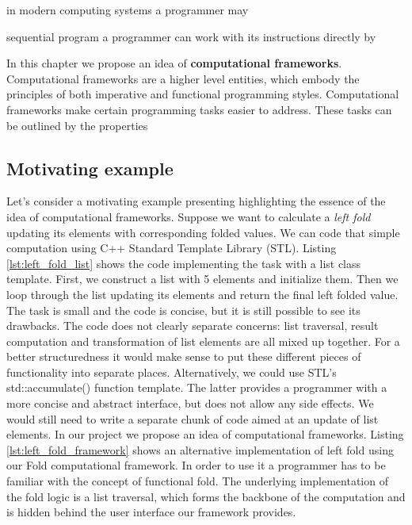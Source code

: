 in modern computing systems a programmer may 

sequential program a programmer can work with its instructions directly by 

\quad In this chapter we propose an idea of \textbf{computational frameworks}. Computational frameworks are a higher level entities, which embody the principles of both imperative and functional programming styles. Computational frameworks make certain programming tasks easier to address. These tasks can be outlined by the properties 

\subsection{Motivating example}
\label{frameworks_motivating_example}
\quad Let's consider a motivating example presenting  highlighting the essence of the idea of computational frameworks. Suppose we want to calculate a \textit{left fold} updating its elements with corresponding folded values.\newline\null
\quad We can code that simple computation using C++ Standard Template Library (STL). Listing \ref{lst:left_fold_list} shows the code implementing the task with a list class template. First, we construct a list with 5 elements and initialize them. Then we loop through the list updating its elements and return the final left folded value. The task is small and the code is concise, but it is still possible to see its drawbacks. The code does not clearly separate concerns: list traversal, result computation and transformation of list elements are all mixed up together. For a better structuredness it would make sense to put these different pieces of functionality into separate places. Alternatively, we could use STL's std::accumulate() function template. The latter provides a programmer with a more concise and abstract interface, but does not allow any side effects. We would still need to write a separate chunk of code aimed at an update of list elements.\newline\null 
\quad In our project we propose an idea of computational frameworks. Listing \ref{lst:left_fold_framework} shows an alternative implementation of left fold using our Fold computational framework. In order to use it a programmer has to be familiar with the concept of functional fold. The underlying implementation of the fold logic is a list traversal, which forms the backbone of the computation and is hidden behind the user interface our framework provides. 

